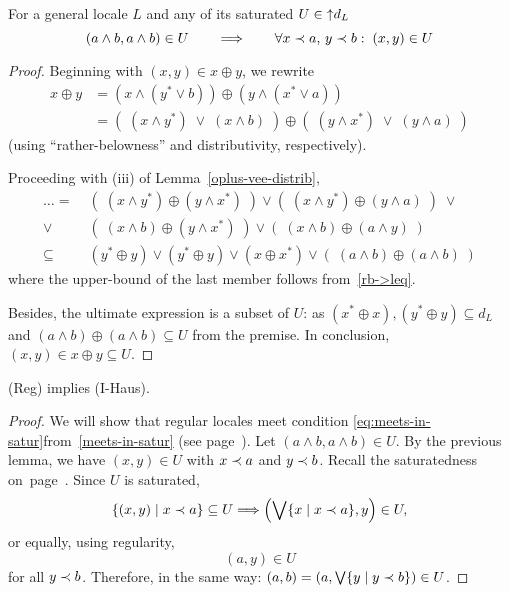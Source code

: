 \begin{lem}
  For a general locale $L$ and any of its saturated $U\in \left\uparrow
  d_L\right.$
  \[
    (a \wedge b, a \wedge b) \in U \qquad \Longrightarrow \qquad \forall x \prec
    a, \, y \prec b: \; (x, y) \in U
  \]
\end{lem}
\begin{proof}
  Beginning with $(x, y)\in x \oplus y$, we rewrite
  \begin{align*}
    x \oplus y &= (x \wedge (y^* \vee b)) \oplus (y \wedge (x^* \vee a)) \\
               &= (\; (x \wedge y^*) \; \vee \; (x \wedge b) \; ) \oplus (\; (y
    \wedge x^*) \; \vee \; (y \wedge a) \; )
  \end{align*}
  (using ``rather-belowness'' and distributivity, respectively).

  Proceeding with (iii) of Lemma~\ref{oplus-vee-distrib}\thinspace,
  \begin{align*}
     \ldots = \; &(\; (x \wedge y^*) \oplus (y \wedge x^*) \; ) \vee 
            (\; (x \wedge y^*) \oplus (y \wedge a) \; ) \; \vee \\
            \vee \; &(\; (x \wedge b) \oplus (y \wedge x^*) \; ) \vee
            (\; (x \wedge b) \oplus (a \wedge y) \; ) \\
     \subseteq \; &(y^*\oplus y) \vee (y^*\oplus y) \vee (x\oplus x^*) \vee (\;
            (a \wedge b)\oplus(a \wedge b) \;)
  \end{align*}
  where the upper-bound of the last member follows
  from~\ref{rb->leq}\thinspace.

  Besides, the ultimate expression is a subset of $U$:
  as $(x^*\oplus x), (y^*\oplus y)\subseteq d_L$ and $(a \wedge b)\oplus(a
  \wedge b)\subseteq U$ from the premise.
  In conclusion, $(x, y)\in x \oplus y \subseteq U$.
\end{proof}

\begin{thm}
  (Reg) implies (I-Haus).
\end{thm}
\begin{proof}
  We will show that regular locales meet condition
  \eqref{eq:meets-in-satur}\thinspace from~\ref{meets-in-satur} (see
  page~\pageref{meets-in-satur}).
  Let $(a \wedge b, a \wedge b) \in U$.
  By the previous lemma, we have $(x, y)\in U$ with $x \prec a$ and $y \prec b$.
  Recall the saturatedness on~page~\pageref{df:satur}\thinspace.
  Since $U$ is saturated,
  \[
    \left\{ (x, y) \mid x \prec a \right\} \subseteq U
    \Longrightarrow
    \left(\bigvee \{x \mid x \prec a\}, y\right)\in U,
  \]
  or equally, using regularity,
  \[
    \left(a, y\right)\in U
  \]
  for all $y \prec b$.
  Therefore, in the same way:
  $(a, b) = \left(a, \bigvee \{y \mid y \prec b\}\right)\in U$.
\end{proof}

